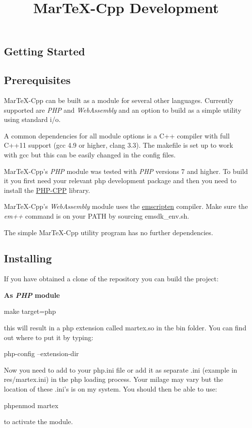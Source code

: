 \begin{page}
%
%

\title{MarTeX-Cpp Development}

\section{Getting Started}
\subsection{Prerequisites}

MarTeX-Cpp can be built as a module for several other languages. Currently supported are \textit{PHP} and \textit{WebAssembly} and an option to build as a simple utility using standard i/o.

A common dependencies for all module options is a C++ compiler with full C++11 support (gcc 4.9 or higher, clang 3.3). The makefile is set up to work with gcc but this can be easily changed in the config files.

MarTeX-Cpp's \textit{PHP} module was tested with \textit{PHP} versions 7 and higher. To build it you first need your relevant php development package and then you need to install the \href{http://www.php-cpp.com/}{PHP-CPP} library. 

MarTeX-Cpp's \textit{WebAssembly} module uses the \href{https://kripken.github.io/emscripten-site/}{emscripten} compiler. Make sure the \textit{em++} command is on your PATH by sourcing emsdk_env.sh.

The simple MarTeX-Cpp utility program has no further dependencies.

\subsection{Installing}

If you have obtained a clone of the repository you can build the project:

\textbf{As \textit{PHP} module}
\begin{code}
make target=php
\end{code}
this will result in a php extension called martex.so in the bin folder. You can find out where to put it by typing:
\begin{code}
php-config --extension-dir
\end{code}
Now you need to add  to your php.ini file or add it as separate .ini (example in res/martex.ini) in the php loading process. Your milage may vary but the location of these .ini's is  on my system. You should then be able to use:
\begin{code}
phpenmod martex
\end{code}
to activate the module.


\end{page}
